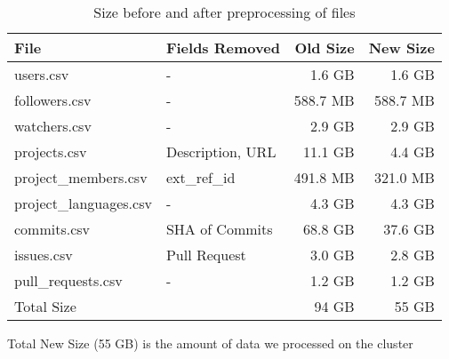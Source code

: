 \vspace{25px}
\begin{table}[htb]
    \centering

    \begin{tabular}{@{}llrr@{}}
    \toprule
        File & Fields Removed & Old Size & New Size \\
    \midrule
        users.csv              & -                &   1.6 GB &    1.6 GB \\
        followers.csv          & -                & 588.7 MB &  588.7 MB \\
        watchers.csv           & -                &   2.9 GB &    2.9 GB \\
        projects.csv           & Description, URL &  11.1 GB &    4.4 GB \\
        project\_members.csv   & ext\_ref\_id     & 491.8 MB &  321.0 MB \\
        project\_languages.csv & -                &   4.3 GB &    4.3 GB \\
        commits.csv            & SHA of Commits   &  68.8 GB &   37.6 GB \\
        issues.csv             & Pull Request     &   3.0 GB &    2.8 GB \\
        pull\_requests.csv     & -                &   1.2 GB &    1.2 GB \\
    \midrule
        Total Size             &                  &    94 GB &     55 GB \\
    \bottomrule
    \end{tabular}

    \caption{Size before and after preprocessing of files}
    \small{Total New Size (55 GB) is the amount of data we processed on the cluster}
\end{table}

